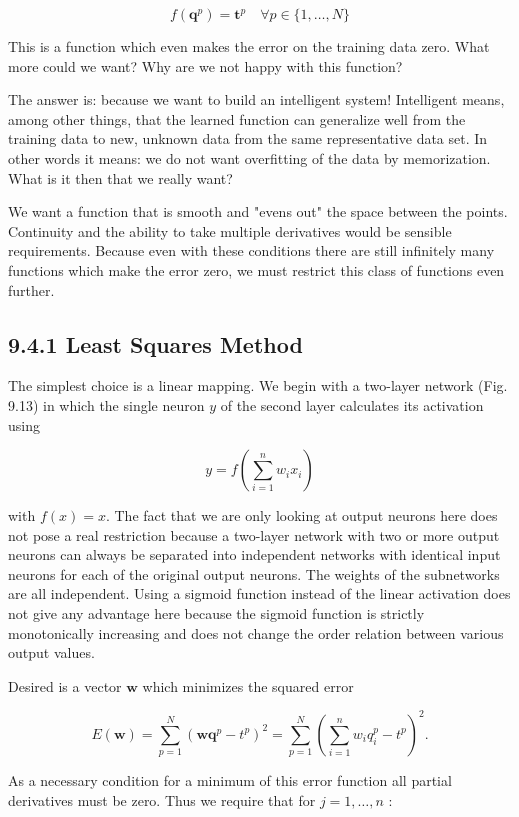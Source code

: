\documentclass[10pt]{article}
\begin{document}
$$
f\left(\boldsymbol{q}^{p}\right)=\boldsymbol{t}^{p} \quad \forall p \in\{1, \ldots, N\}
$$

This is a function which even makes the error on the training data zero. What more could we want? Why are we not happy with this function?

The answer is: because we want to build an intelligent system! Intelligent means, among other things, that the learned function can generalize well from the training data to new, unknown data from the same representative data set. In other words it means: we do not want overfitting of the data by memorization. What is it then that we really want?

We want a function that is smooth and "evens out" the space between the points. Continuity and the ability to take multiple derivatives would be sensible requirements. Because even with these conditions there are still infinitely many functions which make the error zero, we must restrict this class of functions even further.

\subsection*{9.4.1 Least Squares Method}
The simplest choice is a linear mapping. We begin with a two-layer network (Fig. 9.13) in which the single neuron $y$ of the second layer calculates its activation using

$$
y=f\left(\sum_{i=1}^{n} w_{i} x_{i}\right)
$$

with $f(x)=x$. The fact that we are only looking at output neurons here does not pose a real restriction because a two-layer network with two or more output neurons can always be separated into independent networks with identical input neurons for each of the original output neurons. The weights of the subnetworks are all independent. Using a sigmoid function instead of the linear activation does not give any advantage here because the sigmoid function is strictly monotonically increasing and does not change the order relation between various output values.

Desired is a vector $\boldsymbol{w}$ which minimizes the squared error

$$
E(\boldsymbol{w})=\sum_{p=1}^{N}\left(\boldsymbol{w} \boldsymbol{q}^{p}-t^{p}\right)^{2}=\sum_{p=1}^{N}\left(\sum_{i=1}^{n} w_{i} q_{i}^{p}-t^{p}\right)^{2} .
$$

As a necessary condition for a minimum of this error function all partial derivatives must be zero. Thus we require that for $j=1, \ldots, n$ :
\end{document}
